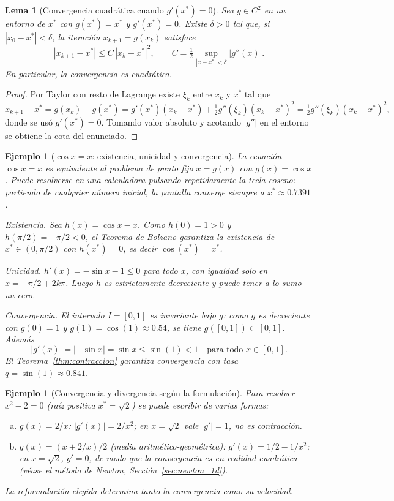 \documentclass[a4paper,11pt]{report}
\newtheorem{lemma}[theorem]{Lema}
\newtheorem{example}[theorem]{Ejemplo}
\begin{document}
\begin{lemma}[Convergencia cuadrática cuando $g'(x^*)=0$]\label{lem:orden_pf}
Sea $g\in C^2$ en un entorno de $x^*$ con $g(x^*)=x^*$ y $g'(x^*)=0$.
Existe $\delta>0$ tal que, si $|x_0-x^*|<\delta$, la iteración
$x_{k+1}=g(x_k)$ satisface
\[
|x_{k+1}-x^*|\le C\,|x_k-x^*|^2,\qquad
C=\tfrac{1}{2}\sup_{|x-x^*|<\delta}|g''(x)|.
\]
En particular, la convergencia es cuadrática.
\end{lemma}

\begin{proof}
Por Taylor con resto de Lagrange existe $\xi_k$ entre $x_k$ y $x^*$ tal que
\[
x_{k+1}-x^* = g(x_k)-g(x^*)
= g'(x^*)(x_k-x^*)+\tfrac{1}{2}g''(\xi_k)(x_k-x^*)^2
= \tfrac{1}{2}g''(\xi_k)(x_k-x^*)^2,
\]
donde se usó $g'(x^*)=0$.  Tomando valor absoluto y acotando $|g''|$ en el
entorno se obtiene la cota del enunciado.
\end{proof}

\begin{example}[$\cos x = x$: existencia, unicidad y convergencia]\label{ex:cos_x}
La ecuación $\cos x = x$ es equivalente al problema de punto fijo $x = g(x)$ con
$g(x)=\cos x$.  Puede resolverse en una calculadora pulsando repetidamente la
tecla coseno: partiendo de cualquier número inicial, la pantalla converge siempre
a $x^*\approx 0.7391$.

\textit{Existencia.}
Sea $h(x)=\cos x - x$.  Como $h(0)=1>0$ y $h(\pi/2)=-\pi/2<0$,
el Teorema de Bolzano garantiza la existencia de $x^*\in(0,\pi/2)$
con $h(x^*)=0$, es decir $\cos(x^*)=x^*$.

\textit{Unicidad.}
$h'(x)=-\sin x - 1\le 0$ para todo $x$, con igualdad solo en
$x=-\pi/2+2k\pi$.  Luego $h$ es estrictamente decreciente y
puede tener a lo sumo un cero.

\textit{Convergencia.}
El intervalo $I=[0,1]$ es invariante bajo $g$:
como $g$ es decreciente con $g(0)=1$ y $g(1)=\cos(1)\approx0.54$,
se tiene $g([0,1])\subset[0,1]$.  Además
\[
|g'(x)|=|{-\sin x}|=\sin x\le\sin(1)<1\quad\text{para todo }x\in[0,1].
\]
El Teorema~\ref{thm:contraccion} garantiza convergencia con tasa $q=\sin(1)\approx0.841$.
\end{example}

\begin{example}[Convergencia y divergencia según la formulación]
Para resolver $x^2-2=0$ (raíz positiva $x^*=\sqrt{2}$) se puede escribir de varias formas:
\begin{enumerate}[(a)]
\item $g(x)=2/x$: $|g'(x)|=2/x^2$; en $x=\sqrt{2}$ vale $|g'|=1$, \emph{no} es contracción.
\item $g(x)=(x+2/x)/2$ (media aritmético-geométrica): $g'(x)=1/2-1/x^2$;
en $x=\sqrt{2}$, $g'=0$, de modo que la convergencia es en realidad \emph{cuadrática}
(véase el método de Newton, Sección~\ref{sec:newton_1d}).
\end{enumerate}
La reformulación elegida determina tanto la convergencia como su velocidad.
\end{example}
\end{document}
